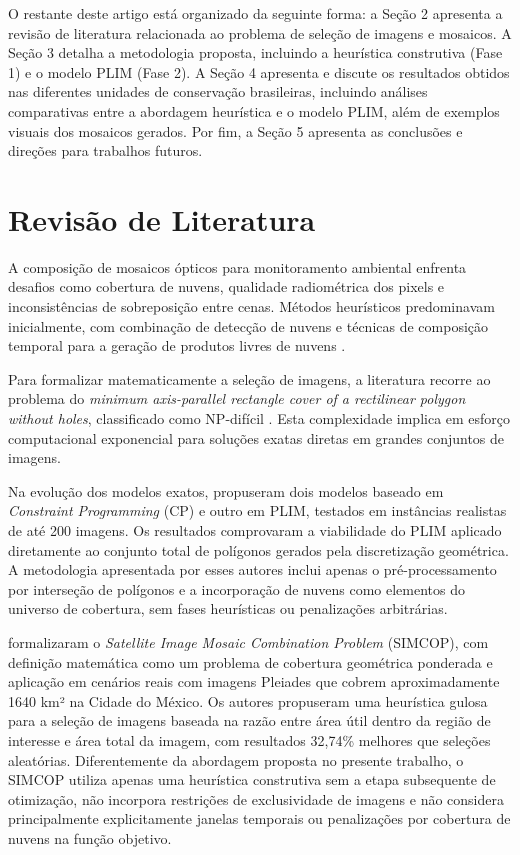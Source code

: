 \documentclass[a4paper,11pt]{article}
\begin{document}
O restante deste artigo está organizado da seguinte forma: a Seção 2 apresenta a revisão de literatura relacionada ao problema de seleção de imagens e mosaicos. A Seção 3 detalha a metodologia proposta, incluindo a heurística construtiva (Fase 1) e o modelo PLIM (Fase 2). A Seção 4 apresenta e discute os resultados obtidos nas diferentes unidades de conservação brasileiras, incluindo análises comparativas entre a abordagem heurística e o modelo PLIM, além de exemplos visuais dos mosaicos gerados. Por fim, a Seção 5 apresenta as conclusões e direções para trabalhos futuros.

\vspace{-6mm}
\section{Revisão de Literatura}
\vspace{-3mm}
A composição de mosaicos ópticos para monitoramento ambiental enfrenta desafios como cobertura de nuvens, qualidade radiométrica dos pixels e inconsistências de sobreposição entre cenas. Métodos heurísticos predominavam inicialmente, com combinação de detecção de nuvens e técnicas de composição temporal para a geração de produtos livres de nuvens \citep{kempeneers:2017}.

Para formalizar matematicamente a seleção de imagens, a literatura recorre ao problema do 
\emph{minimum axis-parallel rectangle cover of a rectilinear polygon without holes}, 
classificado como NP-difícil \citep{KumarRamesh1995, masek1978}. Esta complexidade implica em esforço computacional exponencial para soluções exatas diretas em grandes conjuntos de imagens.

Na evolução dos modelos exatos, \citet{combarro-simon-constraint-2023} propuseram dois modelos baseado em \textit{Constraint Programming} (CP) e outro em PLIM, testados em instâncias realistas de até 200 imagens. Os resultados comprovaram a viabilidade do PLIM aplicado diretamente ao conjunto total de polígonos gerados pela discretização geométrica. A metodologia apresentada por esses autores inclui apenas o pré-processamento por interseção de polígonos e a incorporação de nuvens como elementos do universo de cobertura, sem fases heurísticas ou penalizações arbitrárias.

\citet{combarro-simon-simcop:2023} formalizaram o \textit{Satellite Image Mosaic Combination Problem} (SIMCOP), com definição matemática como um problema de cobertura geométrica ponderada e aplicação em cenários reais com imagens Pleiades que cobrem aproximadamente 1640 km² na Cidade do México. Os autores propuseram uma heurística gulosa para a seleção de imagens baseada na razão entre área útil dentro da região de interesse e área total da imagem, com resultados 32,74\% melhores que seleções aleatórias. Diferentemente da abordagem proposta no presente trabalho, o SIMCOP utiliza apenas uma heurística construtiva sem a etapa subsequente de otimização, não incorpora restrições de exclusividade de imagens e não considera principalmente explicitamente janelas temporais ou penalizações por cobertura de nuvens na função objetivo.
\end{document}
